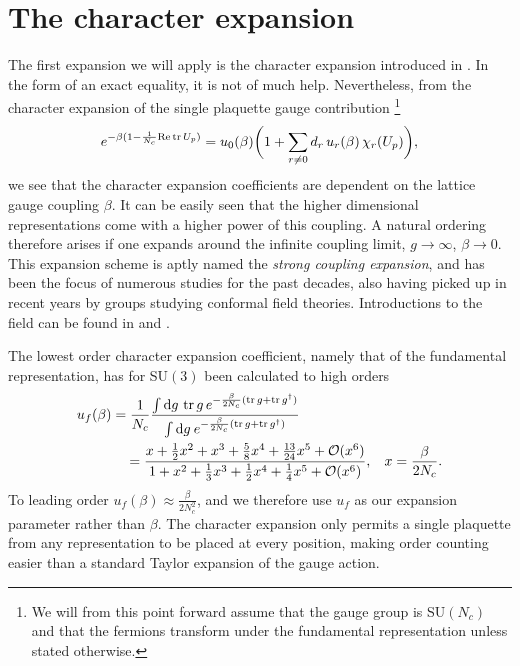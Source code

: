 \section{The character expansion} \label{sec-char_exp}

The first expansion we will apply is the character expansion introduced in 
. In the form of an exact equality, it is not of much
help. Nevertheless, from the character expansion of the single plaquette gauge
contribution
\footnote{We will from this point forward assume that the gauge group is SU$(N_c)$
  and that the fermions transform under the fundamental representation unless
  stated otherwise.}
%
\begin{equation}
  e^{-\beta (1 - \frac{1}{N_c} \text{Re} \operatorname{tr} U_p)} = u_0(\beta) \bigg(1 +
  \sum_{r \neq 0} d_r\, u_r(\beta)\, \chi_r(U_p) \bigg),
\end{equation}
%
we see that the character expansion coefficients are dependent on the lattice
gauge coupling $\beta$. It can be easily seen that the higher dimensional
representations come with a higher power of this coupling. A natural ordering
therefore arises if one expands around the infinite coupling limit, $g\to\infty$,
$\beta\to0$. This expansion scheme is aptly named the \emph{strong coupling
  expansion}, and has been the focus of numerous studies for the past decades,
also having picked up in recent years by groups studying conformal field
theories. Introductions to the field can be found in \cite{Drouffe:1983fv} and
\cite{montvay1997quantum}.

The lowest order character expansion coefficient, namely that of the fundamental
representation, has for SU$(3)$ been calculated to high orders
%
\begin{align}
  u_f(\beta) &= \frac{1}{N_c} \frac{\int \mathrm{d} g\, \tr g\, e^{-\frac{\beta}{2 N_c}
    ( \tr g + \tr g^{\dagger})}}{\int \mathrm{d} g\: e^{-\frac{\beta}{2 N_c}
    ( \tr g + \tr g^{\dagger})}} \nonumber\\
  &\hskip1em= \frac{
    x + \frac{1}{2} x^2 + x^3 + \frac{5}{8} x^4 + \frac{13}{24} x^5 + \mathcal{O}(x^6)%
  }{%
    1 + x^2 + \frac{1}{3} x^3 + \frac{1}{2} x^4 + \frac{1}{4} x^5 + \mathcal{O}(x^6)%
  }, \hskip2ex x=\frac{\beta}{2 N_c}.
\end{align}
%
To leading order $u_f(\beta) \approx \frac{\beta}{2 N_c^2}$, and we
therefore use $u_f$ as our expansion parameter rather than $\beta$. The
character expansion only permits a single plaquette from any representation to
be placed at every position, making order counting easier than a standard Taylor
expansion of the gauge action.

